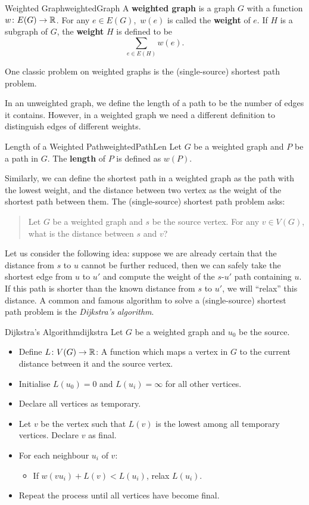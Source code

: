 \documentclass[math]{amznotes}
\theoremstyle{remark}
\newcommand{\0}{\mathbf{0}}
\newcommand{\1}{\mathbf{1}}
\begin{document}
\begin{dfnbox}{Weighted Graph}{weightedGraph}
    A {\color{red} \textbf{weighted graph}} is a graph $G$ with a function $w \colon E(G) \to \mathbb{R}$. For any $e \in E(G)$,~$w(e)$ is called the {\color{red} \textbf{weight}} of $e$. If $H$ is a subgraph of $G$, the {\color{red} \textbf{weight}} $H$ is defined to be
    \begin{equation*}
        \sum_{e \in E(H)}w(e).
    \end{equation*}
\end{dfnbox} 
One classic problem on weighted graphs is the (single-source) shortest path problem.

In an unweighted graph, we define the length of a path to be the number of edges it contains. However, in a weighted graph we need a different definition to distinguish edges of different weights.
\begin{dfnbox}{Length of a Weighted Path}{weightedPathLen}
    Let $G$ be a weighted graph and $P$ be a path in $G$. The {\color{red} \textbf{length}} of $P$ is defined as $w(P)$.
\end{dfnbox}
Similarly, we can define the shortest path in a weighted graph as the path with the lowest weight, and the distance between two vertex as the weight of the shortest path between them. The (single-source) shortest path problem asks:
\begin{quote}
    Let $G$ be a weighted graph and $s$ be the source vertex. For any $v \in V(G)$, what is the distance between $s$ and $v$?
\end{quote}
Let us consider the following idea: suppose we are already certain that the distance from $s$ to $u$ cannot be further reduced, then we can safely take the shortest edge from $u$ to $u'$ and compute the weight of the $s$-$u'$ path containing $u$. If this path is shorter than the known distance from $s$ to $u'$, we will ``relax'' this distance. A common and famous algorithm to solve a (single-source) shortest path problem is the \textit{Dijkstra's algorithm}.
\begin{tecbox}{Dijkstra's Algorithm}{dijkstra}
    Let $G$ be a weighted graph and $u_0$ be the source.
    \begin{itemize}
        \item Define $L \colon V(G) \to \mathbb{R}$: A function which maps a vertex in $G$ to the current distance between it and the source vertex. 
        \item Initialise $L(u_0) = 0$ and $L(u_i) = \infty$ for all other vertices.
        \item Declare all vertices as temporary.
        \item Let $v$ be the vertex such that $L(v)$ is the lowest among all temporary vertices. Declare $v$ as final.
        \item For each neighbour $u_i$ of $v$:
        \begin{itemize}
            \item If $w(vu_i) + L(v) < L(u_i)$, relax $L(u_i)$.
        \end{itemize}
        \item Repeat the process until all vertices have become final.
    \end{itemize} 
\end{tecbox}
\end{document}
